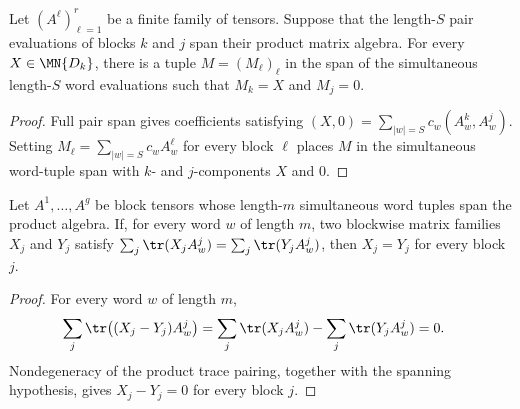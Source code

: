 \begin{lemma}
    \label{lem:pair_product_span_arbitrary_first_value}
    \leanok
    Let $(A^\ell)_{\ell=1}^r$ be a finite family of tensors. Suppose that the
    length-$S$ pair evaluations of blocks $k$ and $j$ span their product
    matrix algebra. For every $X\in\MN{D_k}$, there is a tuple
    $M=(M_\ell)_\ell$ in the span of the simultaneous length-$S$ word
    evaluations such that $M_k=X$ and $M_j=0$.
\end{lemma}

\begin{proof}
    \leanok
    Full pair span gives coefficients satisfying
    $(X,0) = \sum_{|w|=S}c_w(A^k_w,A^j_w)$.
    Setting $M_\ell=\sum_{|w|=S}c_wA^\ell_w$ for every block $\ell$ places $M$
    in the simultaneous word-tuple span with $k$- and $j$-components
    $X$ and $0$.
\end{proof}

\begin{lemma}
    \label{lem:block_matrices_equal_from_trace_pairings}
    \leanok
    Let $A^1,\ldots,A^g$ be block tensors whose length-$m$ simultaneous word
    tuples span the product algebra. If, for every word $w$ of length $m$,
    two blockwise matrix families $X_j$ and $Y_j$ satisfy
    $\sum_j\tr(X_jA^j_w) = \sum_j\tr(Y_jA^j_w)$,
    then $X_j=Y_j$ for every block $j$.
\end{lemma}

\begin{proof}
    \leanok
    For every word $w$ of length $m$,
    \begin{align}
        \sum_j\tr\!\left((X_j-Y_j)A^j_w\right)
         & =
        \sum_j\tr(X_jA^j_w)
        -
        \sum_j\tr(Y_jA^j_w) =
        0.
        \notag
    \end{align}
    Nondegeneracy of the product trace pairing, together with the spanning
    hypothesis, gives $X_j-Y_j=0$ for every block $j$.
\end{proof}

